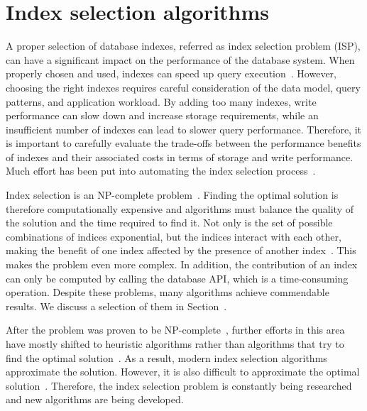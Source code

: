 \section{Index selection algorithms}

A proper selection of database indexes, referred as index selection problem (ISP), can have a significant impact on the performance of the database system. When properly chosen and used, indexes can speed up query execution~\citep{IndexSurvey20}. However, choosing the right indexes requires careful consideration of the data model, query patterns, and application workload. By adding too many indexes, write performance can slow down and increase storage requirements, while an insufficient number of indexes can lead to slower query performance. Therefore, it is important to carefully evaluate the trade-offs between the performance benefits of indexes and their associated costs in terms of storage and write performance. Much effort has been put into automating the index selection process~\citep{CoPhy11, Drop, AutoAdmin, Anytime20, DRL, MCTS}.

Index selection is an NP-complete problem~\citep{NP-complete}. Finding the optimal solution is therefore computationally expensive and algorithms must balance the quality of the solution and the time required to find it. Not only is the set of possible combinations of indices exponential, but the indices interact with each other, making the benefit of one index affected by the presence of another index~\citep{IndexInteraction}. This makes the problem even more complex. In addition, the contribution of an index can only be computed by calling the database API, which is a time-consuming operation. Despite these problems, many algorithms achieve commendable results. We discuss a selection of them in Section~.

After the problem was proven to be NP-complete~\citep{NP-complete}, further efforts in this area have mostly shifted to heuristic algorithms rather than algorithms that try to find the optimal solution~\citep{Drop,AutoAdmin,Anytime20,Extend,DRL,MCTS}. As a result, modern index selection algorithms approximate the solution. However, it is also difficult to approximate the optimal solution~\citep{NPHardApproximation}. Therefore, the index selection problem is constantly being researched and new algorithms are being developed.

